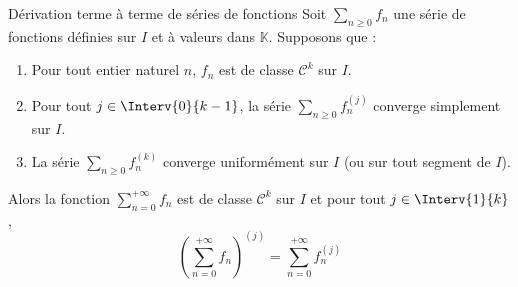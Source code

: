 \documentclass[a4paper,10pt]{report}
\begin{document}
\begin{Theoreme}{Dérivation terme à terme de séries de fonctions}
Soit $\sum_{n \geq 0} f_n$ une série de fonctions définies sur $I$ et à valeurs dans $\mathbb{K}$. Supposons que :

\begin{enumerate}
\item Pour tout entier naturel $n$, $f_n$ est de classe $\mathcal{C}^k$ sur $I$.
\item Pour tout $j \in \Interv{0}{k-1}$, la série $\sum_{n \geq 0} f_n^{(j)}$ converge simplement sur $I$.
\item La série $\sum_{n \geq 0} f_n^{(k)}$ converge uniformément sur $I$ (ou sur tout segment de $I$).
\end{enumerate}
Alors la fonction $\sum_{n=0}^{+ \infty} f_n$ est de classe $\mathcal{C}^k$ sur $I$ et pour tout $j \in \Interv{1}{k}$,
$$ \left( \sum_{n=0}^{+ \infty} f_n \right)^{(j)} = \sum_{n=0}^{+ \infty} f_n^{(j)}$$
\end{Theoreme}
\end{document}
